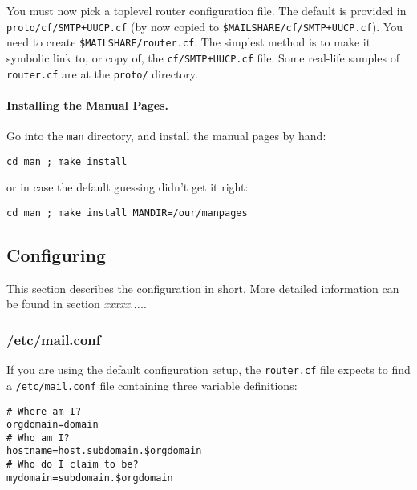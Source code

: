 You must now pick a toplevel router configuration file.  The
default is provided in {\tt proto/cf/SMTP+UUCP.cf} (by now copied to
{\tt \$MAILSHARE/cf/SMTP+UUCP.cf}). You need to create {\tt \$MAILSHARE/router.cf}.
The simplest method is to make it symbolic link to, or copy of,
the {\tt cf/SMTP+UUCP.cf} file.
Some real-life samples of {\tt router.cf} are at the {\tt proto/} directory.




\paragraph{Installing the Manual Pages.}



Go into the {\tt man} directory, and install the manual pages by hand:
\begin{tscreen}
\begin{verbatim}
cd man ; make install
\end{verbatim}
\end{tscreen}

or in case the default guessing didn't get it right:
\begin{tscreen}
\begin{verbatim}
cd man ; make install MANDIR=/our/manpages
\end{verbatim}
\end{tscreen}





\subsection{Configuring}

This section describes the configuration in short. More detailed information 
can be found in section {\em xxxxx....\/}.


\subsubsection{/etc/mail.conf}

If you are using the default configuration setup, the {\tt router.cf} file
expects to find a {\tt /etc/mail.conf} file containing three variable
definitions:
\begin{tscreen}
\begin{verbatim}
# Where am I?
orgdomain=domain
# Who am I?
hostname=host.subdomain.$orgdomain
# Who do I claim to be?
mydomain=subdomain.$orgdomain
\end{verbatim}
\end{tscreen}

